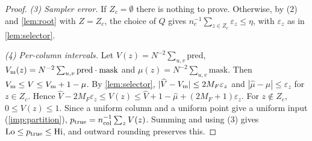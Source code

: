 \documentclass[11pt,letterpaper]{article}
\theoremstyle{definition}
\theoremstyle{remark}
\newcommand{\mask}{\mathrm{mask}}
\newcommand{\pred}{\mathrm{pred}}
\begin{document}
\begin{proof}
\emph{(3) Sampler error.} If \(Z_c=\emptyset\) there is nothing to prove.
Otherwise, by (2) and \cref{lem:root} with \(Z=Z_c\), the choice of \(Q\)
gives \(n_c^{-1}\sum_{z\in Z_c}\varepsilon_z\le\eta\), with
\(\varepsilon_z\) as in \cref{lem:selector}.

\emph{(4) Per-column intervals.} Let \(V(z)=N^{-2}\sum_{u,v}\pred\),
\(V_{\rm m}(z)=N^{-2}\sum_{u,v}\pred\cdot\mask\) and
\(\mu(z)=N^{-2}\sum_{u,v}\mask\). Then
\(V_{\rm m}\le V\le V_{\rm m}+1-\mu\). By \cref{lem:selector},
\(|\widehat V-V_{\rm m}|\le2M_F\varepsilon_z\) and
\(|\widehat\mu-\mu|\le\varepsilon_z\) for \(z\in Z_c\). Hence
\(\widehat V-2M_F\varepsilon_z\le V(z)\le\widehat V+1-\widehat\mu+(2M_F+1)\varepsilon_z\).
For \(z\notin Z_c\), \(0\le V(z)\le1\). Since a uniform column and a
uniform point give a uniform input (\cref{imp:partition}),
\(p_{\rm true}=n_{\rm col}^{-1}\sum_zV(z)\). Summing and using (3)
gives \(\mathrm{Lo}\le p_{\rm true}\le\mathrm{Hi}\), and outward rounding
preserves this.
\end{proof}
\end{document}
